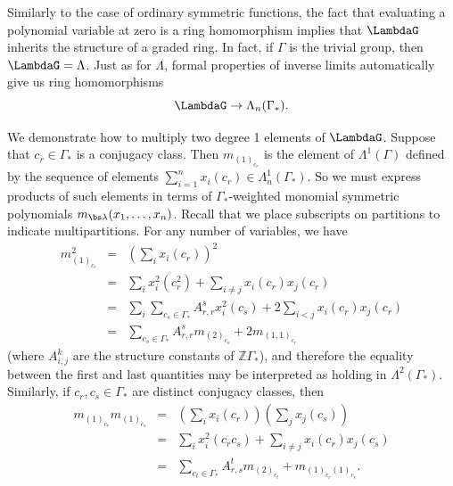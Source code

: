 Similarly to the case of ordinary symmetric functions, the fact that evaluating a polynomial variable at zero is a ring homomorphism implies that $\LambdaG$ inherits the structure of a graded ring. In fact, if $\Gamma$ is the trivial group, then $\LambdaG = \Lambda$. Just as for $\Lambda$, formal properties of inverse limits automatically give us ring homomorphisms
\[
\LambdaG \to \Lambda_n(\Gamma_*).
\]

\begin{example} \label{degree_2_example}
We demonstrate how to multiply two degree 1 elements of $\LambdaG$. Suppose that $c_r \in \Gamma_*$ is a conjugacy class. Then $m_{(1)_{c_r}}$ is the element of $\Lambda^1(\Gamma)$ defined by the sequence of elements $\sum_{i=1}^n x_i(c_r) \in \Lambda_n^1(\Gamma_*)$. So we must express products of such elements in terms of $\Gamma_*$-weighted monomial symmetric polynomials $m_{\bs\lambda}(x_1, \ldots, x_n)$. Recall that we place subscripts on partitions to indicate multipartitions. For any number of variables, we have
\begin{eqnarray*}
m_{(1)_{c_r}}^2 &=& \left( \sum_i x_i(c_r) \right)^2 \\
&=& \sum_i x_i^2(c_r^2) +  \sum_{i \neq j} x_i(c_r) x_j(c_r) \\
&=& \sum_i \sum_{c_s \in \Gamma_*} A_{r,r}^s x_i^2(c_s) + 2 \sum_{i<j} x_i(c_r) x_j(c_r) \\
&=& \sum_{c_s \in \Gamma_*} A_{r,r}^s m_{(2)_{c_s}} + 2 m_{(1,1)_{c_r}}
\end{eqnarray*}
(where $A_{i,j}^k$ are the structure constants of $\mathbb{Z}\Gamma_*$), and therefore the equality between the first and last quantities may be interpreted as holding in $\Lambda^2(\Gamma_*)$. Similarly, if $c_r,c_s \in \Gamma_*$ are distinct conjugacy classes, then 
\begin{eqnarray*}
m_{(1)_{c_r}}m_{(1)_{c_s}} &=& \left( \sum_i x_i(c_r) \right)\left( \sum_j x_j(c_s) \right) \\
&=& \sum_i x_i^2(c_rc_s) +  \sum_{i \neq j} x_i(c_r) x_j(c_s) \\
&=& \sum_{c_t \in \Gamma_*} A_{r,s}^t m_{(2)_{c_t}} +  m_{(1)_{c_r}(1)_{c_s}}.
\end{eqnarray*}
\end{example}

